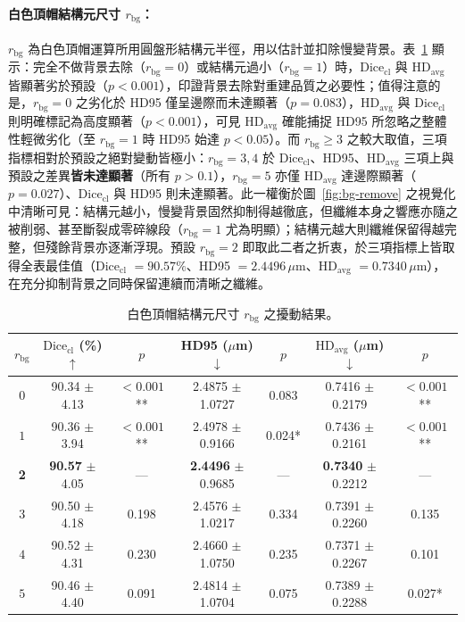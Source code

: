 \paragraph{白色頂帽結構元尺寸 $r_{\text{bg}}$：} $r_{\text{bg}}$ 為白色頂帽運算所用圓盤形結構元半徑，用以估計並扣除慢變背景。表~\ref{tab:param-bg} 顯示：完全不做背景去除（$r_{\text{bg}} = 0$）或結構元過小（$r_{\text{bg}} = 1$）時，$\text{Dice}_{\text{cl}}$ 與 $\text{HD}_{\text{avg}}$ 皆顯著劣於預設（$p < 0.001$），印證背景去除對重建品質之必要性；值得注意的是，$r_{\text{bg}} = 0$ 之劣化於 HD95 僅呈邊際而未達顯著（$p = 0.083$），$\text{HD}_{\text{avg}}$ 與 $\text{Dice}_{\text{cl}}$ 則明確標記為高度顯著（$p < 0.001$），可見 $\text{HD}_{\text{avg}}$ 確能捕捉 HD95 所忽略之整體性輕微劣化（至 $r_{\text{bg}} = 1$ 時 HD95 始達 $p < 0.05$）。而 $r_{\text{bg}} \ge 3$ 之較大取值，三項指標相對於預設之絕對變動皆極小：$r_{\text{bg}} = 3, 4$ 於 $\text{Dice}_{\text{cl}}$、HD95、$\text{HD}_{\text{avg}}$ 三項上與預設之差異\textbf{皆未達顯著}（所有 $p > 0.1$），$r_{\text{bg}} = 5$ 亦僅 $\text{HD}_{\text{avg}}$ 達邊際顯著（$p = 0.027$）、$\text{Dice}_{\text{cl}}$ 與 HD95 則未達顯著。此一權衡於圖~\ref{fig:bg-remove} 之視覺化中清晰可見：結構元越小，慢變背景固然抑制得越徹底，但纖維本身之響應亦隨之被削弱、甚至斷裂成零碎線段（$r_{\text{bg}} = 1$ 尤為明顯）；結構元越大則纖維保留得越完整，但殘餘背景亦逐漸浮現。預設 $r_{\text{bg}} = 2$ 即取此二者之折衷，於三項指標上皆取得全表最佳值（$\text{Dice}_{\text{cl}}$ $= 90.57\%$、HD95 $= 2.4496\,\mu\text{m}$、$\text{HD}_{\text{avg}}$ $= 0.7340\,\mu\text{m}$），在充分抑制背景之同時保留連續而清晰之纖維。

\begin{table}[htbp]
  \centering
  \caption{白色頂帽結構元尺寸 $r_{\text{bg}}$ 之擾動結果。}
  \label{tab:param-bg}
  \small
  \setlength{\tabcolsep}{4pt}
  \begin{tabular}{ccccccc}
    \toprule
    $r_{\text{bg}}$ & $\text{Dice}_{\text{cl}}$ (\%) $\uparrow$ & $p$ & HD95 ($\mu$m) $\downarrow$ & $p$ & $\text{HD}_{\text{avg}}$ ($\mu$m) $\downarrow$ & $p$ \\
    \midrule
    $0$  & 90.34 $\pm$ 4.13 & $<\!0.001$** & 2.4875 $\pm$ 1.0727 & 0.083  & 0.7416 $\pm$ 0.2179 & $<\!0.001$** \\
    $1$  & 90.36 $\pm$ 3.94 & $<\!0.001$** & 2.4978 $\pm$ 0.9166 & 0.024* & 0.7436 $\pm$ 0.2161 & $<\!0.001$** \\
    \textbf{2} & \textbf{90.57} $\pm$ 4.05 & --- & \textbf{2.4496} $\pm$ 0.9685 & --- & \textbf{0.7340} $\pm$ 0.2212 & --- \\
    $3$  & 90.50 $\pm$ 4.18 & 0.198 & 2.4576 $\pm$ 1.0217 & 0.334 & 0.7391 $\pm$ 0.2260 & 0.135 \\
    $4$  & 90.52 $\pm$ 4.31 & 0.230 & 2.4660 $\pm$ 1.0750 & 0.235 & 0.7371 $\pm$ 0.2267 & 0.101 \\
    $5$  & 90.46 $\pm$ 4.40 & 0.091 & 2.4814 $\pm$ 1.0704 & 0.075 & 0.7389 $\pm$ 0.2288 & 0.027* \\
    \bottomrule
  \end{tabular}
\end{table}

